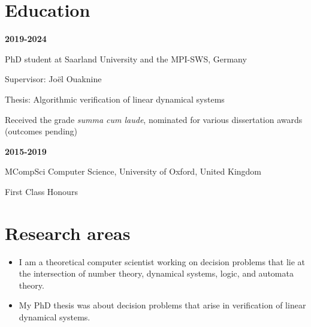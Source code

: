 \documentclass{article}
\begin{document}
	\section*{Education}
		\begin{minipage}{0.3\textwidth}
			\hspace{0.5cm} \textbf{2019-2024}
		\end{minipage}
		\vspace*{0.25cm}
		\begin{minipage}{0.7\textwidth}
			PhD student at Saarland University and the MPI-SWS, Germany
			
			\vspace*{0.2cm}
			Supervisor: Jo\"el Ouaknine 
			
			\vspace*{0.2cm}
			Thesis: Algorithmic verification of linear dynamical systems
			
			\vspace*{0.2cm}
			Received the grade \emph{summa cum laude}, nominated for various dissertation awards (outcomes pending)
                \vspace{0.3cm}
		\end{minipage}
		\vspace{0.85cm}
		\begin{minipage}{0.3\textwidth}
		\hspace{0.5cm} \textbf{2015-2019}
	\end{minipage}
	\begin{minipage}{0.7\textwidth}
		MCompSci Computer Science, University of Oxford, United Kingdom
		
		\vspace*{0.2cm}
		First Class Honours
	\end{minipage}
	\section*{Research areas}
	\begin{itemize}
		\item I am a theoretical computer scientist working on decision problems that lie at the intersection of number theory, dynamical systems, logic, and automata theory.
		\item My PhD thesis was about decision problems that arise in verification of linear dynamical systems.
	\end{itemize}
	
\end{document}

